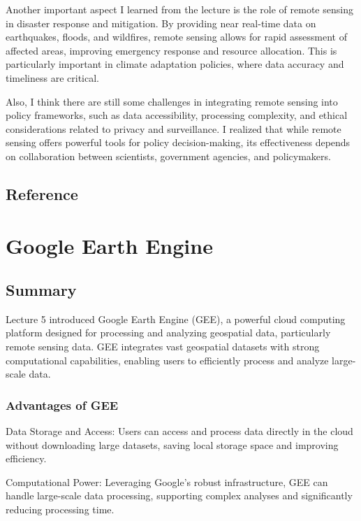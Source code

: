 \documentclass[
  letterpaper,
]{scrbook}
\begin{document}
Another important aspect I learned from the lecture is the role of
remote sensing in disaster response and mitigation. By providing near
real-time data on earthquakes, floods, and wildfires, remote sensing
allows for rapid assessment of affected areas, improving emergency
response and resource allocation. This is particularly important in
climate adaptation policies, where data accuracy and timeliness are
critical.

Also, I think there are still some challenges in integrating remote
sensing into policy frameworks, such as data accessibility, processing
complexity, and ethical considerations related to privacy and
surveillance. I realized that while remote sensing offers powerful tools
for policy decision-making, its effectiveness depends on collaboration
between scientists, government agencies, and policymakers.

\section{Reference}\label{reference-2}


\chapter{Google Earth Engine}\label{google-earth-engine}

\section{Summary}\label{summary-2}

Lecture 5 introduced Google Earth Engine (GEE), a powerful cloud
computing platform designed for processing and analyzing geospatial
data, particularly remote sensing data. GEE integrates vast geospatial
datasets with strong computational capabilities, enabling users to
efficiently process and analyze large-scale data.

\subsection{Advantages of GEE}\label{advantages-of-gee}

Data Storage and Access: Users can access and process data directly in
the cloud without downloading large datasets, saving local storage space
and improving efficiency.

Computational Power: Leveraging Google's robust infrastructure, GEE can
handle large-scale data processing, supporting complex analyses and
significantly reducing processing time.
\end{document}
